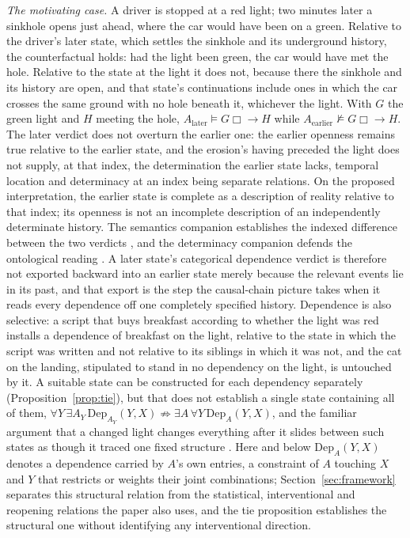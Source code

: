\documentclass[11pt]{article}
\begin{document}
\noindent\textit{The motivating case.} A driver is stopped at a red light; two minutes later a sinkhole opens just ahead, where the car would have been on a green. Relative to the driver's later state, which settles the sinkhole and its underground history, the counterfactual holds: had the light been green, the car would have met the hole. Relative to the state at the light it does not, because there the sinkhole and its history are open, and that state's continuations include ones in which the car crosses the same ground with no hole beneath it, whichever the light. With $G$ the green light and $H$ meeting the hole, $A_{\mathrm{later}} \models G \mathrel{\Box\!\!\rightarrow} H$ while $A_{\mathrm{earlier}} \not\models G \mathrel{\Box\!\!\rightarrow} H$. The later verdict does not overturn the earlier one: the earlier openness remains true relative to the earlier state, and the erosion's having preceded the light does not supply, at that index, the determination the earlier state lacks, temporal location and determinacy at an index being separate relations. On the proposed interpretation, the earlier state is complete as a description of reality relative to that index; its openness is not an incomplete description of an independently determinate history. The semantics companion establishes the indexed difference between the two verdicts \cite{AethusSemantics}, and the determinacy companion defends the ontological reading \cite{AethusRealist}. A later state's categorical dependence verdict is therefore not exported backward into an earlier state merely because the relevant events lie in its past, and that export is the step the causal-chain picture takes when it reads every dependence off one completely specified history. Dependence is also selective: a script that buys breakfast according to whether the light was red installs a dependence of breakfast on the light, relative to the state in which the script was written and not relative to its siblings in which it was not, and the cat on the landing, stipulated to stand in no dependency on the light, is untouched by it. A suitable state can be constructed for each dependency separately (Proposition~\ref{prop:tie}), but that does not establish a single state containing all of them, $\forall Y\,\exists A_Y\,\mathrm{Dep}_{A_Y}(Y, X) \not\Rightarrow \exists A\,\forall Y\,\mathrm{Dep}_A(Y, X)$, and the familiar argument that a changed light changes everything after it slides between such states as though it traced one fixed structure \cite{Aethus}. Here and below $\mathrm{Dep}_A(Y, X)$ denotes a dependence carried by $A$'s own entries, a constraint of $A$ touching $X$ and $Y$ that restricts or weights their joint combinations; Section~\ref{sec:framework} separates this structural relation from the statistical, interventional and reopening relations the paper also uses, and the tie proposition establishes the structural one without identifying any interventional direction.
\end{document}
